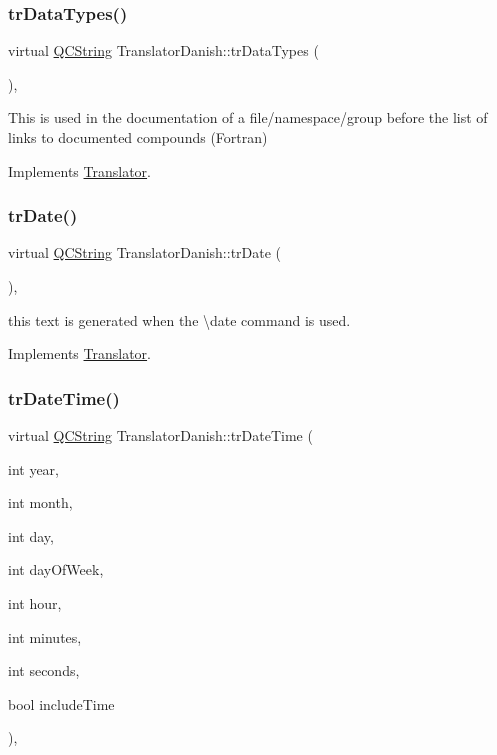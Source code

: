 \subsubsection{\texorpdfstring{trDataTypes()}{trDataTypes()}}
{\footnotesize\ttfamily virtual \mbox{\hyperlink{class_q_c_string}{Q\+C\+String}} Translator\+Danish\+::tr\+Data\+Types (\begin{DoxyParamCaption}{ }\end{DoxyParamCaption})\hspace{0.3cm}{\ttfamily [inline]}, {\ttfamily [virtual]}}

This is used in the documentation of a file/namespace/group before the list of links to documented compounds (Fortran) 

Implements \mbox{\hyperlink{class_translator}{Translator}}.

\mbox{\label{class_translator_danish_a5bb8f0a475b985f1c7efc4a1ccaf012f}} 
\subsubsection{\texorpdfstring{trDate()}{trDate()}}
{\footnotesize\ttfamily virtual \mbox{\hyperlink{class_q_c_string}{Q\+C\+String}} Translator\+Danish\+::tr\+Date (\begin{DoxyParamCaption}{ }\end{DoxyParamCaption})\hspace{0.3cm}{\ttfamily [inline]}, {\ttfamily [virtual]}}

this text is generated when the \textbackslash{}date command is used. 

Implements \mbox{\hyperlink{class_translator}{Translator}}.

\mbox{\label{class_translator_danish_a6b1b8f959c432ab7959b2509d0195c1f}} 
\subsubsection{\texorpdfstring{trDateTime()}{trDateTime()}}
{\footnotesize\ttfamily virtual \mbox{\hyperlink{class_q_c_string}{Q\+C\+String}} Translator\+Danish\+::tr\+Date\+Time (\begin{DoxyParamCaption}\item[{int}]{year,  }\item[{int}]{month,  }\item[{int}]{day,  }\item[{int}]{day\+Of\+Week,  }\item[{int}]{hour,  }\item[{int}]{minutes,  }\item[{int}]{seconds,  }\item[{bool}]{include\+Time }\end{DoxyParamCaption})\hspace{0.3cm}{\ttfamily [inline]}, {\ttfamily [virtual]}}

